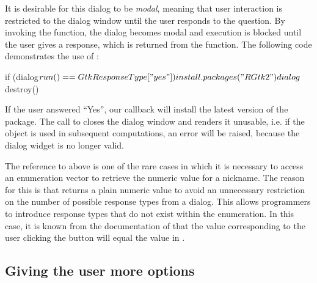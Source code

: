 \documentclass[article,shortnames]{jss}
\begin{document}
It is desirable for this dialog to be \emph{modal}, meaning that user
interaction
is restricted to the dialog window until the user responds to the
question. By invoking the  function, the dialog
becomes modal and execution is blocked until the user gives a
response, which is returned from the function. The following code
demonstrates the use of :
\begin{Code}
if (dialog$run() == GtkResponseType["yes"])
 install.packages("RGtk2")
dialog$destroy()
\end{Code}
If the user answered
``Yes'', our callback will install the latest version of the
 package. The call to  closes the
dialog window and renders it unusable, i.e. if the object is used in
subsequent computations, an error will be raised, because the dialog
widget is no longer valid.

The reference to  above is one of the rare cases
in which it is necessary to access an enumeration vector to retrieve
the numeric value for a nickname. The reason for this is that
 returns a plain numeric value to avoid an
unnecessary restriction on the number of possible response types from
a dialog. This allows programmers to introduce response types that do
not exist within the  enumeration.
In this case, it is known from the documentation of
 that the value corresponding to the user
clicking the  button will equal the  value in
.

\subsection{Giving the user more options}
\end{document}
